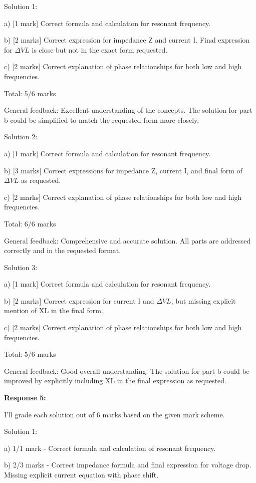 \documentclass[a4paper,11pt]{article}
\begin{document}
Solution 1:

a) [1 mark] Correct formula and calculation for resonant frequency.

b) [2 marks] Correct expression for impedance Z and current I. Final expression for \(\Delta VL\) is close but not in the exact form requested.

c) [2 marks] Correct explanation of phase relationships for both low and high frequencies.

Total: 5/6 marks

General feedback: Excellent understanding of the concepts. The solution for part b could be simplified to match the requested form more closely.

Solution 2:

a) [1 mark] Correct formula and calculation for resonant frequency.

b) [3 marks] Correct expressions for impedance Z, current I, and final form of \(\Delta VL\) as requested.

c) [2 marks] Correct explanation of phase relationships for both low and high frequencies.

Total: 6/6 marks

General feedback: Comprehensive and accurate solution. All parts are addressed correctly and in the requested format.

Solution 3:

a) [1 mark] Correct formula and calculation for resonant frequency.

b) [2 marks] Correct expression for current I and \(\Delta VL\), but missing explicit mention of XL in the final form.

c) [2 marks] Correct explanation of phase relationships for both low and high frequencies.

Total: 5/6 marks

General feedback: Good overall understanding. The solution for part b could be improved by explicitly including XL in the final expression as requested.

\bigskip
\textbf{Response 5:}

I'll grade each solution out of 6 marks based on the given mark scheme.

Solution 1:

a) 1/1 mark - Correct formula and calculation of resonant frequency.

b) 2/3 marks - Correct impedance formula and final expression for voltage drop. Missing explicit current equation with phase shift.
\end{document}
